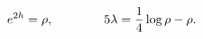 \begin{equation}\label{badsingular}
e^{2h}=\rho, \qquad \qquad 5\lambda={1\over 4}\log{\rho} - \rho.
\end{equation}

